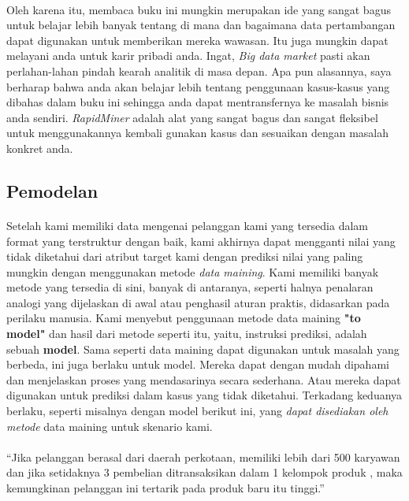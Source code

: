    \paragraph{}  Oleh karena itu, membaca buku ini mungkin merupakan ide yang sangat bagus untuk belajar lebih banyak tentang di mana dan bagaimana data pertambangan dapat digunakan untuk memberikan mereka wawasan. Itu juga mungkin dapat melayani anda untuk karir pribadi anda. Ingat, \textit{Big data market} pasti akan perlahan-lahan pindah kearah analitik di masa depan. Apa pun alasannya, saya berharap bahwa anda akan belajar lebih tentang penggunaan kasus-kasus yang dibahas dalam buku ini sehingga anda dapat mentransfernya ke masalah bisnis anda sendiri. \textit{RapidMiner} adalah alat yang sangat bagus dan sangat fleksibel untuk menggunakannya kembali gunakan kasus dan sesuaikan dengan masalah konkret anda. 

\subsection{Pemodelan}

\paragraph{} Setelah kami memiliki data mengenai pelanggan kami yang tersedia dalam format yang terstruktur dengan baik, kami akhirnya dapat mengganti nilai yang tidak diketahui dari atribut target kami dengan prediksi nilai yang paling mungkin dengan menggunakan metode\textit{ data maining}. Kami memiliki banyak metode yang tersedia di sini, banyak di antaranya, seperti halnya penalaran analogi yang dijelaskan di awal atau penghasil aturan praktis, didasarkan pada perilaku manusia. Kami menyebut penggunaan metode data maining \textbf{"to model"} dan hasil dari metode seperti itu, yaitu, instruksi prediksi, adalah sebuah \textbf{model}. Sama seperti data maining dapat digunakan untuk masalah yang berbeda, ini juga berlaku untuk model. Mereka dapat dengan mudah dipahami dan menjelaskan proses yang mendasarinya secara sederhana. Atau mereka dapat digunakan untuk prediksi dalam kasus yang tidak diketahui. Terkadang keduanya berlaku, seperti misalnya dengan model berikut ini, yang\textit{ dapat disediakan oleh metode} data maining untuk skenario kami.

\paragraph{} “Jika pelanggan berasal dari daerah perkotaan, memiliki lebih dari 500 karyawan dan jika setidaknya 3 pembelian ditransaksikan dalam 1 kelompok produk , maka kemungkinan pelanggan ini tertarik pada produk baru itu tinggi.”

